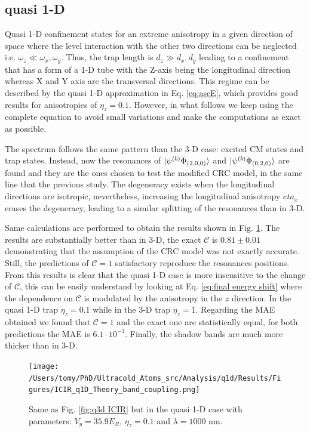 \documentclass[aps,pre,twocolumn,superscriptaddress,showpacs]{revtex4-1}
\begin{document}
\subsection{quasi 1-D} \label{subsec:quasi 1-D}
Quasi 1-D confinement states for an extreme anisotropy in a given direction of space where the level interaction with the other two directions can be neglected i.e. $\omega_z \ll \omega_x, \omega_y$. Thus, the trap length is $d_z \gg d_x, d_y$ leading to a confinement that has a form of a 1-D tube with the Z-axis being the longitudinal direction whereas X and Y axis are the transversal directions. This regime can be described by the quasi 1-D approximation in Eq. \eqref{eq:ascE}, which provides good results for anisotropies of $\eta_z = 0.1$. However, in what follows we keep using the complete equation to avoid small variations and make the computations as exact as possible.

The spectrum follows the same pattern than the 3-D case: excited CM states and trap states. Instead, now the resonances of $\ket{ \psi^{(b)} \Phi_{(2,0,0)}} $ and $\ket{ \psi^{(b)} \Phi_{(0,2,0)}}$ are found and they are the ones chosen to test the modified CRC model, in the same line that the previous study. The degeneracy exists when the longitudinal directions are isotropic, nevertheless, increasing the longitudinal anisotropy $eta_x$ erases the degeneracy, leading to a similar splitting of the resonances than in 3-D.

Same calculations are performed to obtain the results shown in Fig. \ref{fig:q1D ICIR}. The results are substantially better than in 3-D, the exact $\mathcal{C}$ is $0.81 \pm 0.01$ demonstrating that the assumption of the CRC model was not exactly accurate. Still, the predictions of $\mathcal{C} = 1$ satisfactory reproduce the resonances positions. From this results is clear that the quasi 1-D case is more insensitive to the change of $\mathcal{C}$, this can be easily understand by looking at Eq. \eqref{eq:final energy shift} where the dependence on $\mathcal{C}$ is modulated by the anisotropy in the $z$ direction. In the quasi 1-D trap $\eta_z=0.1$ while in the 3-D trap $\eta_z=1$. Regarding the MAE obtained we found that $\mathcal{C}=1$ and the exact one are statistically equal, for both predictions the MAE is $6.1\cdot 10^{-3}$. Finally, the shadow bands are much more thicker than in 3-D.

\begin{figure}[htbp!]
   	 \centering
    	\texttt{[image: /Users/tomy/PhD/Ultracold\_Atoms\_src/Analysis/q1d/Results/Figures/ICIR\_q1D\_Theory\_band\_coupling.png]}
    	\caption{Same as Fig. \ref{fig:q3d ICIR} but in the quasi 1-D case with parameters: $V_y = 35.9E_R$, $\eta_z = 0.1$ and $\lambda=1000$ nm. }
    	\label{fig:q1D ICIR}
	\end{figure}
	
\end{document}
